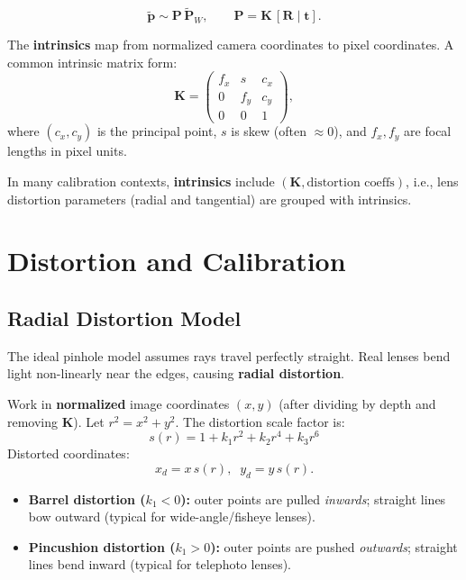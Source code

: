 \documentclass[11pt, oneside]{book}
\newcommand{\vct}[1]{\bm{#1}}           %
\newcommand{\mat}[1]{\mathbf{#1}}       %
\begin{document}
\begin{thmbox}[title={Pinhole Camera Model}]
\[
\tilde{\vct{p}} \sim \mat{P}\,\tilde{\vct{P}}_W,
\qquad
\mat{P} = \mat{K}\,[\mat{R}\mid \vct{t}].
\]
\end{thmbox}

\begin{defbox}[title={Intrinsic Matrix}]
The \textbf{intrinsics} map from normalized camera coordinates to pixel coordinates.
A common intrinsic matrix form:
\[
\mat{K}=
\begin{pmatrix}
f_x & s   & c_x\\
0   & f_y & c_y\\
0   & 0   & 1
\end{pmatrix},
\]
where $(c_x,c_y)$ is the principal point, $s$ is skew (often $\approx 0$), and $f_x,f_y$ are focal lengths in pixel units.
\end{defbox}

In many calibration contexts, \textbf{intrinsics} include $(\mat{K},\text{distortion coeffs})$, i.e., lens distortion parameters
(radial and tangential) are grouped with intrinsics.

\section{Distortion and Calibration}

\subsection{Radial Distortion Model}

\begin{defbox}[title={Radial Distortion}]
The ideal pinhole model assumes rays travel perfectly straight. Real lenses bend light non-linearly near the edges,
causing \textbf{radial distortion}.
\end{defbox}

\begin{thmbox}[title={Radial Distortion Equations}]
Work in \textbf{normalized} image coordinates $(x,y)$ (after dividing by depth and removing $\mat{K}$).
Let $r^2 = x^2 + y^2$. The distortion scale factor is:
\[
s(r)= 1 + k_1 r^2 + k_2 r^4 + k_3 r^6
\]
Distorted coordinates:
\[
x_d = x\,s(r),\;\; y_d = y\,s(r).
\]
\end{thmbox}

\begin{itemize}
  \item \textbf{Barrel distortion ($k_1 < 0$):} outer points are pulled \emph{inwards}; straight lines bow outward (typical for wide-angle/fisheye lenses).
  \item \textbf{Pincushion distortion ($k_1 > 0$):} outer points are pushed \emph{outwards}; straight lines bend inward (typical for telephoto lenses).
\end{itemize}
\end{document}
